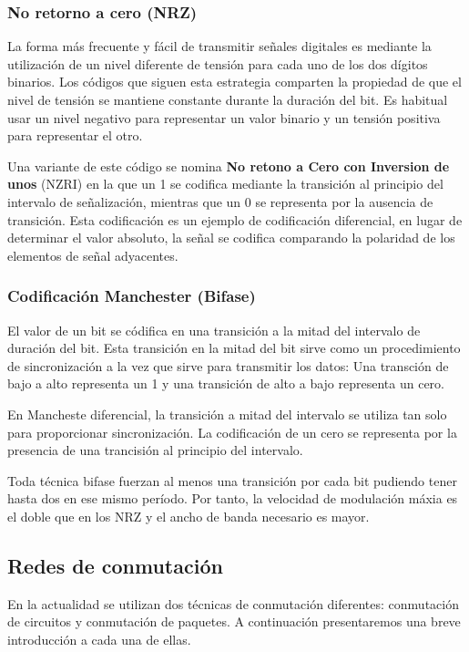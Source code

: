 \subsubsection*{No retorno a cero (NRZ)}
La forma más frecuente y fácil de transmitir señales digitales es mediante la utilización de un nivel diferente de tensión para cada uno de los dos dígitos binarios. Los códigos que siguen esta estrategia comparten la propiedad de que el nivel de tensión se mantiene constante durante la duración del bit. Es habitual usar un nivel negativo para representar un valor binario y un tensión positiva para representar el otro.

Una variante de este código se nomina \textbf{No retono a Cero con Inversion de unos} (NZRI) en la que un 1 se codifica mediante la transición al principio del intervalo de señalización, mientras que un 0 se representa por la ausencia de transición. Esta codificación es un ejemplo de codificación diferencial, en lugar de determinar el valor absoluto, la señal se codifica comparando la polaridad de los elementos de señal adyacentes.

\subsubsection*{Codificación Manchester (Bifase)}
El valor de un bit se códifica en una transición a la mitad del intervalo de duración del bit. Esta transición en la mitad del bit sirve como un procedimiento de sincronización a la vez que sirve para transmitir los datos: Una transción de bajo a alto representa un 1 y una transición de alto a bajo representa un cero.

En Mancheste diferencial, la transición a mitad del intervalo se utiliza tan solo para proporcionar sincronización. La codificación de un cero se representa por la presencia de una trancisión al principio del intervalo. 

Toda técnica bifase fuerzan al menos una transición por cada bit pudiendo tener hasta dos en ese mismo período. Por tanto, la velocidad de modulación máxia es el doble que en los NRZ y el ancho de banda necesario es mayor.

\subsection{Redes de conmutación}
En la actualidad se utilizan dos técnicas de conmutación diferentes: conmutación de circuitos y conmutación de paquetes. A continuación presentaremos una breve introducción a cada una de ellas.

